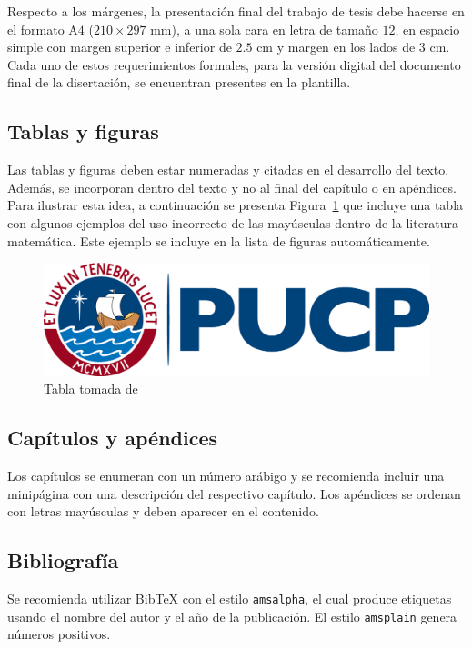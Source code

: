 \par

Respecto a los m\'argenes, la presentaci\'on final del trabajo de tesis debe
hacerse en el formato A\(4\) (\(210 \times 297\) mm), a una sola cara en letra
de tama\~no \(12\), en espacio simple con margen superior e inferior de \(2.5\)
cm y margen en los lados de \(3\) cm.
Cada uno de estos requerimientos formales,
para la versi\'on digital del documento final de la disertaci\'on,
se encuentran presentes en la plantilla.

\subsection{Tablas y figuras}
Las tablas y figuras deben estar numeradas y citadas en el desarrollo del
texto. Adem\'as, se incorporan dentro  del texto y no al final del cap\'itulo
o en ap\'endices. Para ilustrar esta idea, a continuaci\'on se presenta
\mbox{Figura \ref{LogoAntiguo}} que incluye una tabla con algunos ejemplos del
uso incorrecto de las may\'usculas dentro de la literatura matem\'atica.
Este ejemplo se incluye en la lista de figuras autom\'aticamente.
\begin{figure}[H]
  \centering
  \includegraphics[width=14.5cm]{images/2020-pucp-logo.png}
  \caption{Tabla tomada de \cite{EW2012}}\label{LogoAntiguo}
\end{figure}

\subsection{Cap\'itulos y ap\'endices}
Los cap\'itulos se enumeran con un n\'umero ar\'abigo y se recomienda incluir
una minip\'agina con una descripci\'on del respectivo cap\'itulo.
Los ap\'endices se ordenan con letras may\'usculas y deben aparecer en el
contenido.

\subsection{Bibliograf\'ia}
Se recomienda utilizar BibTeX con el estilo \texttt{amsalpha},
el cual produce etiquetas usando el nombre del autor y el a\~no de la
publicaci\'on. El estilo \texttt{amsplain} genera números positivos.


